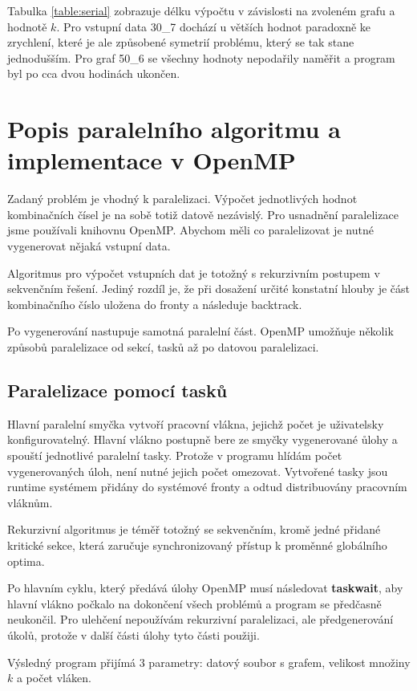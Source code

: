 \documentclass{article}
\begin{document}
Tabulka \ref{table:serial} zobrazuje délku výpočtu v závislosti na zvoleném grafu a hodnotě $k$. Pro vstupní data 30\_7 dochází u větších hodnot paradoxně ke zrychlení, které je ale způsobené symetrií problému, který se tak stane jednodušším. Pro graf 50\_6 se všechny hodnoty nepodařily naměřit a program byl po cca dvou hodinách ukončen.

\section{Popis paralelního algoritmu a implementace v OpenMP}
Zadaný problém je vhodný k paralelizaci. Výpočet jednotlivých hodnot kombinačních čísel je na sobě totiž datově nezávislý. Pro usnadnění paralelizace jsme používali knihovnu OpenMP. Abychom měli co paralelizovat je nutné vygenerovat nějaká vstupní data. 

Algoritmus pro výpočet vstupních dat je totožný s rekurzivním postupem v sekvenčním řešení. Jediný rozdíl je, že při dosažení určité konstatní hlouby je část kombinačního číslo uložena do fronty a následuje backtrack.

Po vygenerování nastupuje samotná paralelní část. OpenMP umožňuje několik způsobů paralelizace od sekcí, tasků až po datovou paralelizaci.

\subsection{Paralelizace pomocí tasků}
Hlavní paralelní smyčka vytvoří pracovní vlákna, jejichž počet je uživatelsky konfigurovatelný. Hlavní vlákno postupně bere ze smyčky vygenerované ůlohy a spouští jednotlivé paralelní tasky. Protože v programu hlídám počet vygenerovaných úloh, není nutné jejich počet omezovat. Vytvořené tasky jsou runtime systémem přidány do systémové fronty a odtud distribuovány pracovním vláknům.

Rekurzivní algoritmus je téměř totožný se sekvenčním, kromě jedné přidané kritické sekce, která zaručuje synchronizovaný přístup k proměnné globálního optima.

Po hlavním cyklu, který předává úlohy OpenMP musí následovat \textbf{taskwait}, aby hlavní vlákno počkalo na dokončení všech problémů a program se předčasně neukončil. Pro ulehčení nepoužívám rekurzivní paralelizaci, ale předgenerování úkolů, protože v další části úlohy tyto části použiji.

Výsledný program přijímá 3 parametry: datový soubor s grafem, velikost množiny $k$ a počet vláken.
\end{document}
